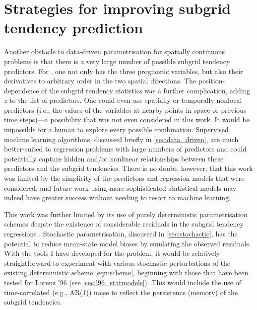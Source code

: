\documentclass[../main.tex]{subfiles}
\begin{document}
\section{Strategies for improving subgrid tendency prediction}
\label{sec:improve_prediction}
Another obstacle to data-driven parametrisation for spatially continuous
problems is that there is a very large number of possible subgrid tendency
predictors. For \rb{}, one not only has the three prognostic variables, but
also their derivatives to arbitrary order in the two spatial directions. The
position-dependence of the subgrid tendency statistics was a further
complication, adding $z$ to the list of predictors. One could even use
spatially or temporally nonlocal predictors (i.e., the values of the variables
at nearby points in space or previous time steps)---a possibility that was not
even considered in this work. It would be impossible for a human to explore
every possible combination. Supervised machine learning algorithms, discussed
briefly in \cref{sec:data_driven}, are much better-suited to regression
problems with large numbers of predictors and could potentially capture hidden
and/or nonlinear relationships between these predictors and the subgrid
tendencies. There is no doubt, however, that this work was limited by the
simplicity of the predictors and regression models that were considered, and
future work using more sophisticated statistical models may indeed have greater
success without needing to resort to machine learning.

This work was further limited by its use of purely deterministic
parametrisation schemes despite the existence of considerable residuals
in the subgrid tendency regressions
. Stochastic parametrisation, discussed in
\cref{sec:stochastic}, has the potential to reduce mean-state model
biases by emulating the observed residuals. With the tools I have developed for
the \rb{} problem, it would be relatively straightforward to experiment with
various stochastic perturbations of the existing deterministic scheme
\cref{eqn:scheme}, beginning with those that have been tested for
Lorenz '96 (see \cref{sec:l96_statmodels}). This would include the use
of time-correlated (e.g., AR(1)) noise to reflect the persistence (memory)
of the subgrid tendencies.
\end{document}
